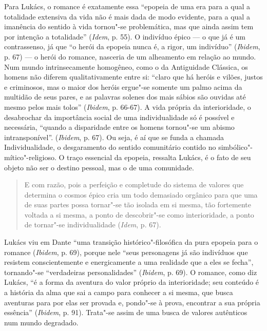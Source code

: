 Para Lukács, o romance é exatamente essa ``epopeia de uma era para a
qual a totalidade extensiva da vida não é mais dada de modo evidente,
para a qual a imanência do sentido à vida tornou"-se problemática, mas
que ainda assim tem por intenção a totalidade'' (\emph{Idem}, p. 55). O
indivíduo épico --- o que já é um contrassenso, já que ``o herói da
epopeia nunca é, a rigor, um indivíduo'' (\emph{Ibidem}, p. 67) --- o
herói do romance, nasceria de um alheamento em relação ao mundo. Num
mundo intrinsecamente homogêneo, como o da Antiguidade Clássica, os
homens não diferem qualitativamente entre si: ``claro que há heróis e
vilões, justos e criminosos, mas o maior dos heróis ergue"-se somente um
palmo acima da multidão de seus pares, e as palavras solenes dos mais
sábios são ouvidas até mesmo pelos mais tolos'' (\emph{Ibidem}, p.
66-67). A vida própria da interioridade, o desabrochar da importância
social de uma individualidade só é possível e necessária, ``quando a
disparidade entre os homens tornou"-se um abismo intransponível''.
(\emph{Ibidem}, p. 67). Ou seja, é aí que se funda a chamada
Individualidade, o desgaramento do sentido comunitário contido no
simbólico"-mítico"-religioso. O traço essencial da epopeia, ressalta
Lukács, é o fato de seu objeto não ser o destino pessoal, mas o de uma
comunidade.

\begin{quote}
E com razão, pois a perfeição e completude do sistema de valores que
determina o cosmos épico cria um todo demasiado orgânico para que uma de
suas partes possa tornar"-se tão isolada em si mesma, tão fortemente
voltada a si mesma, a ponto de descobrir"-se como interioridade, a ponto
de tornar"-se individualidade (\emph{Idem}, p. 67).
\end{quote}

Lukács viu em Dante ``uma transição histórico"-filosófica da pura epopeia
para o romance (\emph{Ibidem}, p. 69), porque nele ``seus personagens já
são indivíduos que resistem conscientemente e energicamente a uma
realidade que a eles se fecha'', tornando"-se ``verdadeiras
personalidades'' (\emph{Ibidem}, p. 69). O romance, como diz Lukács,
``é a forma da aventura do valor próprio da interioridade; seu conteúdo
é a história da alma que sai a campo para conhecer a si mesma, que busca
aventuras para por elas ser provada e, pondo"-se à prova, encontrar a sua
própria essência'' (\emph{Ibidem}, p. 91). Trata"-se assim de uma busca
de valores autênticos num mundo degradado.

